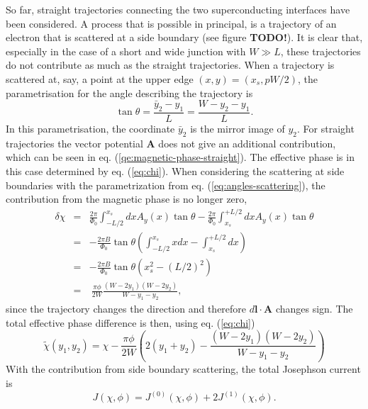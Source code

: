 So far, straight trajectories connecting the two superconducting interfaces have been considered. A process that is possible in principal, is a trajectory of an electron that is scattered at a side boundary (see figure \textbf{TODO!}). It is clear that, especially in the case of a short and wide junction with $W \gg L$, these trajectories do not contribute as much as the straight trajectories. When a trajectory is scattered at, say, a point at the upper edge $(x, y) = (x_s, p W/2)$, the parametrisation for the angle describing the trajectory is
\begin{equation}
\tan \theta = \frac{\bar{y}_2 - y_1}{L} = \frac{W - y_2 - y_1}{L}. \label{eq:angles-scattering}
\end{equation}
In this parametrisation, the coordinate $\bar{y}_2$ is the mirror image of $y_2$. For straight trajectories the vector potential $\mathbf{A}$ does not give an additional contribution, which can be seen in eq. (\ref{qe:magnetic-phase-straight}). The effective phase is in this case determined by eq. (\ref{eq:chi}). When considering the scattering at side boundaries with the parametrization from eq. (\ref{eq:angles-scattering}), the contribution from the magnetic phase is no longer zero,
\begin{eqnarray}
\delta \chi &=& \frac{2 \pi}{\Phi_0} \int_{-L/2}^{x_s} dx A_y(x) \tan \theta  - \frac{2 \pi}{\Phi_0} \int_{x_s}^{+L/2} dx A_y(x) \tan \theta \\
&=& - \frac{2 \pi B }{\Phi_0 } \tan \theta \left( \int_{-L/2}^{x_s} x dx - \int_{x_s}^{+L/2} dx \right) \\
&=& - \frac{2 \pi B}{\Phi_0 } \tan \theta \left( x_s^2 - (L/2)^2 \right) \\
&=& ~ \frac{\pi \phi}{2 W} \frac{(W - 2 y_1) ( W - 2y_2)}{W - y_1 - y_2},
\end{eqnarray}
since the trajectory changes the direction and therefore $d \mathbf{l} \cdot \mathbf{A}$ changes sign. The total effective phase difference is then, using eq. (\ref{eq:chi})
\begin{equation}
\tilde{\chi} (y_1, y_2) = \chi - \frac{\pi \phi}{2 W} \left( 2 (y_1 + y_2) - \frac{(W-2y_1)(W-2y_2)}{W - y_1 - y_2} \right)
\end{equation}
With the contribution from side boundary scattering, the total Josephson current is
\begin{equation}
J \left( \chi, \phi \right) = J^{(0)} \left( \chi, \phi \right)  + 2 J^{(1)} \left( \chi, \phi \right).\label{eq:total-current}
\end{equation}
